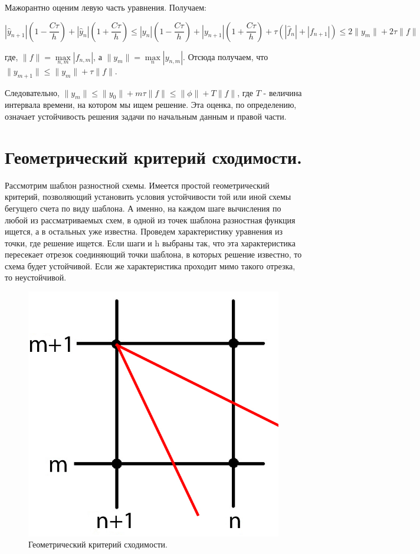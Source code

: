 \documentclass[a4paper,14pt]{article}
\begin{document}
Мажорантно оценим левую часть уравнения. Получаем:

$$|\hat{y}_{n+1}|(1 - \frac{C \tau}{h})+|\hat{y}_n|(1 + \frac{C \tau}{h}) \leqslant |y_n| (1 - \frac{C \tau}{h})+ |y_{n+1}|(1 + \frac{C \tau}{h}) + \tau (|\hat{f}_{n}| + |f_{n+1}|)  \leqslant 2\|y_m\|+2 \tau\|f\|$$

\noindent где, $\|f\|= \max\limits_{n,m}|f_{n,m}|$, а $\|y_m\|= \max\limits_{n}|y_{n,m}|$. Отсюда получаем, что $\|y_{m+1}\| \leqslant \|y_m\|+ \tau\|f\|$.

Следовательно, $\|y_{m}\| \leqslant \|y_0\|+ m\tau\|f\| \leqslant \|\phi\| + T\|f\|$, где $T$ - величина интервала времени, на котором мы ищем решение. Эта оценка,
по определению, означает устойчивость решения задачи по начальным данным и правой части. 

\section{Геометрический критерий сходимости.}
Рассмотрим шаблон разностной схемы. Имеется простой геометрический критерий, позволяющий установить условия устойчивости той или иной схемы бегущего счета по виду шаблона. А именно, на каждом шаге вычисления по любой из рассматриваемых схем, в одной из точек шаблона разностная функция ищется, а в остальных уже известна. Проведем характеристику уравнения из точки, где решение ищется. Если шаги и h выбраны так, что эта характеристика пересекает отрезок соединяющий точки шаблона, в которых решение известно, то схема будет устойчивой. Если же характеристика проходит мимо такого отрезка, то неустойчивой.

\begin{figure}[h!]
\centering
\includegraphics[scale=0.4]{сетка_сход.jpg}
\caption{\label{pic3}Геометрический критерий сходимости.}
\end{figure}
\end{document}
